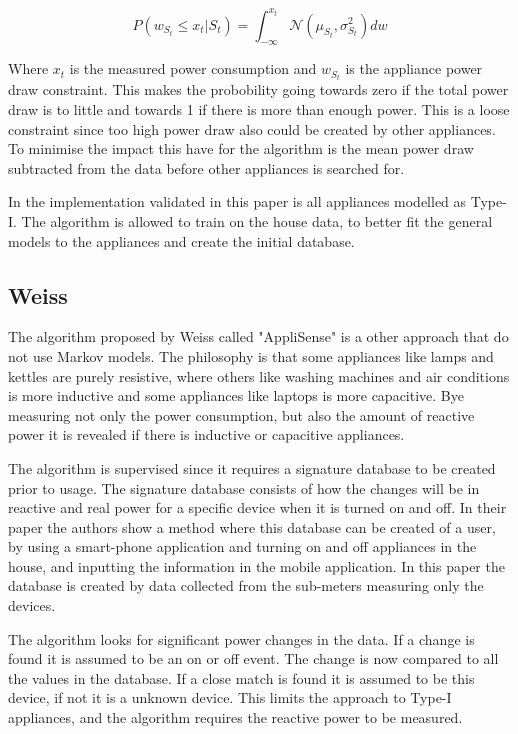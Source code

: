 \begin{equation}
	P(w_{S_t} \leq x_t | S_t ) = \int_{-\infty}^{x_t}  \mathcal{N}( \mu_{S_t} , \sigma_{S_t}^2 ) dw
	\label{EQ:PCA}
\end{equation}

Where $x_t$ is the measured power consumption and $w_{S_t}$ is the appliance power draw constraint. This makes the probobility going towards zero if the total power draw is to little and towards 1 if there is more than enough power. This is a loose constraint since too high power draw also could be created by other appliances. To minimise the impact this have for the algorithm is the mean power draw subtracted from the data before other appliances is searched for. 

In the implementation validated in this paper is all appliances modelled as Type-I. The algorithm is allowed to train on the house data, to better fit the general models to the appliances and create the initial database.  

\subsection{Weiss}
The algorithm proposed by Weiss called "AppliSense" is a other approach that do not use Markov models\citep{RefWorks:23}. The philosophy is that some appliances like lamps and kettles are purely resistive, where others like washing machines and air conditions is more inductive and some appliances like laptops is more capacitive. Bye measuring not only the power consumption, but also the amount of reactive power it is revealed if there is inductive or capacitive appliances.

The algorithm is supervised since it requires a signature database to be created prior to usage. The signature database consists of how the changes will be in reactive and real power for a specific device when it is turned on and off. In their paper the authors show a method where this database can be created of a user, by using a smart-phone application and turning on and off appliances in the house, and inputting the information in the mobile application\citep{RefWorks:23}. In this paper the database is created by data collected from the sub-meters measuring only the devices.  

The algorithm looks for significant power changes in the data. If a change is found it is assumed to be an on or off event. The change is now compared to all the values in the database. If a close match is found it is assumed to be this device, if not it is a unknown device. This limits the approach to Type-I appliances, and the algorithm requires the reactive power to be measured. 

